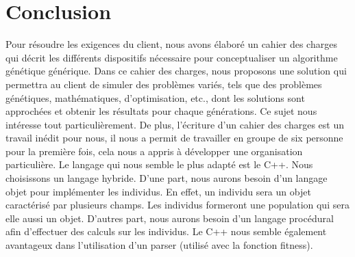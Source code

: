 \documentclass[a4paper,11pt]{article}
\begin{document}
	\section*{Conclusion}
		Pour résoudre les exigences du client, nous avons élaboré un cahier des charges qui décrit les différents dispositifs nécessaire pour conceptualiser un algorithme génétique générique. Dans ce cahier des charges, nous proposons une solution qui permettra au client de simuler des problèmes variés, tels que des problèmes génétiques, mathématiques, d’optimisation, etc., dont les solutions sont approchées et obtenir les résultats pour chaque générations. 
	Ce sujet nous intéresse tout particulièrement. De plus, l’écriture d’un cahier des charges est un travail inédit pour nous, il nous a permit de travailler en groupe de six personne pour la première fois, cela nous a appris à développer une organisation particulière.
	\newline
	Le langage qui nous semble le plus adapté est le C++. Nous choisissons un langage hybride. D’une part, nous aurons besoin d’un langage objet pour implémenter les individus. En effet, un individu sera un objet caractérisé par plusieurs champs. Les individus formeront une population qui sera elle aussi un objet. 
	D’autres part, nous aurons besoin d’un langage procédural afin d’effectuer des calculs sur les individus. Le C++ nous semble également avantageux dans l’utilisation d’un parser (utilisé avec la fonction fitness).
\end{document}

